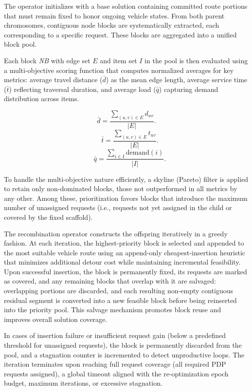 \documentclass[preprint,12pt]{elsarticle}
\begin{document}
The operator initializes with a base solution containing committed route portions that must remain fixed to honor ongoing vehicle states. From both parent chromosomes, contiguous node blocks are systematically extracted, each corresponding to a specific request. These blocks are aggregated into a unified block pool. 

Each block \textit{NB} with edge set \(E\) and item set \(I\) in the pool is then evaluated using a multi-objective scoring function that computes normalized averages for key metrics: average travel distance (\(\bar{d}\)) as the mean edge length, average service time (\(\bar{t}\)) reflecting traversal duration, and average load (\(\bar{q}\)) capturing demand distribution across items.

\begin{equation}
\bar{d} = \frac{\sum_{(u,v) \in E} d_{uv}}{|E|}.
\end{equation}
\begin{equation}
 \quad \bar{t} = \frac{\sum_{(u,v) \in E} t_{uv}}{|E|}.
\end{equation}
\begin{equation}
 \quad \bar{q} = \frac{\sum_{i \in I} \text{demand}(i)}{|I|}.
\end{equation}

To handle the multi-objective nature efficiently, a skyline (Pareto) filter is applied to retain only non-dominated blocks, those not outperformed in all metrics by any other. Among these, prioritization favors blocks that introduce the maximum number of unassigned requests (i.e., requests not yet assigned in the child or covered by the fixed scaffold).

The recombination operator constructs the offspring iteratively in a greedy fashion. At each iteration, the highest-priority block is selected and appended to the most suitable vehicle route using an append-only cheapest-insertion heuristic that minimizes additional detour cost while maintaining incremental feasibility. Upon successful insertion, the block is permanently fixed, its requests are marked as covered, and any remaining blocks that overlap with it are salvaged: overlapping portions are discarded, and each resulting non-empty contiguous residual segment is converted into a new feasible block before being reinserted into the priority pool. This salvage mechanism promotes block reuse and improves overall solution coverage.

In cases of insertion failure or insufficient request gain (below a predefined threshold for unassigned requests), the block is permanently discarded from the pool, and a stagnation counter is incremented to detect unproductive loops. The iteration terminates upon reaching full request coverage (all required PDP requests assigned), a global timeout aligned with the re-optimization epoch budget, maximum iterations, or excessive stagnation.
\end{document}
